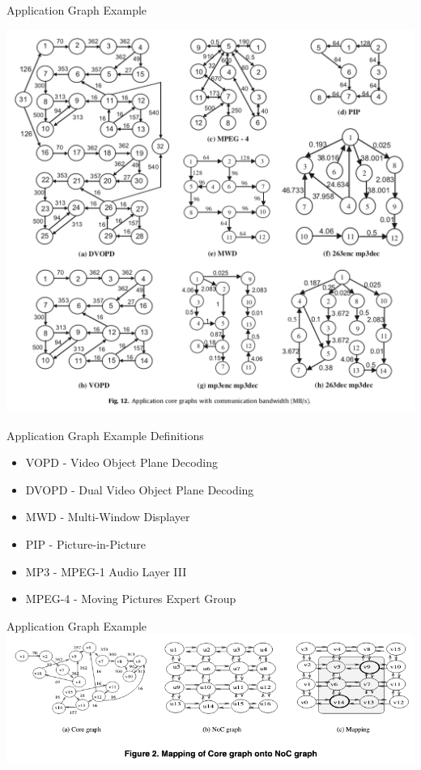 \documentclass{beamer}
\begin{document}
\begin{frame}{Application Graph Example}
	\begin{center}
		\includegraphics[width=0.8\linewidth]{application-graphs-example.png}
	\end{center}
\end{frame}

\begin{frame}{Application Graph Example Definitions}
	\begin{itemize}
		\item VOPD - Video Object Plane Decoding
		\item DVOPD - Dual Video Object Plane Decoding
		\item MWD - Multi-Window Displayer
		\item PIP - Picture-in-Picture
		\item MP3 - MPEG-1 Audio Layer III
		\item MPEG-4 - Moving Pictures Expert Group
	\end{itemize}
\end{frame}

\begin{frame}{Application Graph Example}
	\includegraphics[width=\linewidth]{mapping-example.png}
\end{frame}
\end{document}
